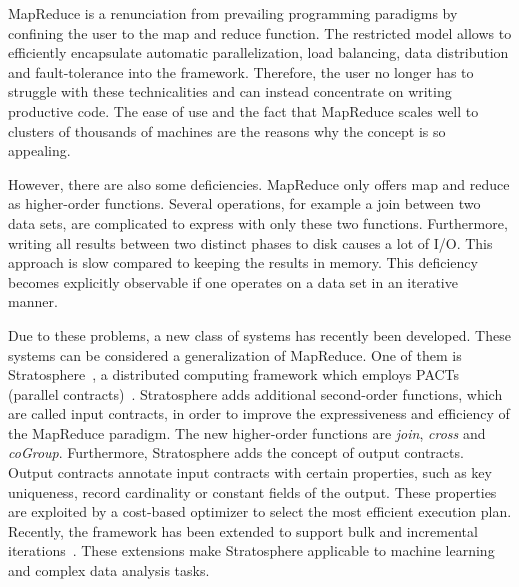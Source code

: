 MapReduce is a renunciation from prevailing programming paradigms by confining the user to the map and reduce function.
The restricted model allows \cite{dean:c2008a} to efficiently encapsulate automatic parallelization, load balancing, data distribution and fault-tolerance into the framework.
Therefore, the user no longer has to struggle with these technicalities and can instead concentrate on writing productive code.
The ease of use and the fact that MapReduce scales well to clusters of thousands of machines are the reasons why the concept is so appealing.

However, there are also some deficiencies.
MapReduce only offers map and reduce as higher-order functions.
Several operations, for example a join between two data sets, are complicated to express with only these two functions.
Furthermore, writing all results between two distinct phases to disk causes a lot of I/O.
This approach is slow compared to keeping the results in memory.
This deficiency becomes explicitly observable if one operates on a data set in an iterative manner.

Due to these problems, a new class of systems has recently been developed.
These systems can be considered a generalization of MapReduce.
One of them is Stratosphere~\cite{battre:2010a}, a distributed computing framework which employs PACTs (parallel contracts)~\cite{alexandrov:2011a}.
Stratosphere adds additional second-order functions, which are called input contracts, in order to improve the expressiveness and efficiency of the MapReduce paradigm.
The new higher-order functions are \emph{join}, \emph{cross} and \emph{coGroup}.
Furthermore, Stratosphere adds the concept of output contracts.
Output contracts annotate input contracts with certain properties, such as key uniqueness, record cardinality or constant fields of the output.
These properties are exploited by a cost-based optimizer to select the most efficient execution plan.
Recently, the framework has been extended to support bulk and incremental iterations~\cite{ewen:pve2012a}.
These extensions make Stratosphere applicable to machine learning and complex data analysis tasks.

